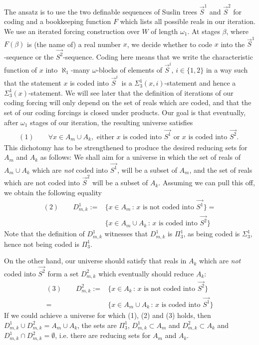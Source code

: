 \documentclass[a4paper,11pt]{article}
\begin{document}
The ansatz is to use the two definable sequences of Suslin trees $\vec{S}^1$ and $\vec{S}^2$ for coding and a bookkeeping function $F$ which lists all possible reals in our iteration. We use an iterated forcing construction over $W$ of length $\omega_1$. At stages $\beta$, where $F(\beta)$ is (the name of) a real number $x$, we decide whether to code $x$ into the $\vec{S}^1$-sequence or the $\vec{S^2}$-sequence. Coding here means that we write the characteristic function of $x$ into $\aleph_1$-many $\omega$-blocks of elements of $\vec{S}^i$, $i \in \{1,2\}$ in a way such that the statement \ldq $x$ is coded into $\vec{S}^i$\rdq\, is a $\Sigma^1_3(x,i)$-statement and hence a $\Sigma^1_3(x)$-statement. We will see later that the definition of iterations of our coding forcing will only depend on the set of reals which are coded, and that the set of our coding forcings is closed under products.
Our goal is that eventually, after $\omega_1$ stages of our iteration, the resulting universe satisfies 
\begin{align*}
(1) \qquad \forall x \in A_m \cup A_k,\text{ either $x$ is coded into $\vec{S^1}$ or $x$ is coded into $\vec{S^2}$. } 
\end{align*} 
This dichotomy has to be strengthened to produce the desired reducing sets for $A_m$ and $A_k$ as follows:
We shall aim for a universe in which the set of reals of $A_m \cup A_k$ which are \emph{not} coded  into $\vec{S^1}$,  will be a subset of $A_m$, and the set of reals which are not coded into $\vec{S}^2$ will be a subset of $A_k$. Assuming we can pull this off, we obtain the following equality
\begin{align*}
(2) \qquad D^1_{m,k}:= & \{ x \in A_m  \, : \, x \text{ is  not coded into $\vec{S^1}$} \}  = \\& \{ x \in A_m  \cup A_k \, : \, x \text{ is coded  into $\vec{S^2}$} \}
\end{align*}
Note that the definition of $D^1_{m,k}$ witnesses that $D^1_{m,k}$ is $\Pi^1_3$, as being coded is $\Sigma^1_3$, hence not being coded is $\Pi^1_3$.

On the other hand, our universe should satisfy that reals in $A_k$ which are \emph{not} coded into $\vec{S^2}$ form a set  $D^2_{m,k}$ which eventually should reduce $A_k$:
\begin{align*}
(3) \qquad D^2_{m,k}:= & \{ x \in  A_k \, : \, x \text{ is  not coded  into $\vec{S^2}$} \} \\=& \{ x \in A_m \cup A_k \, : \, x \text{ is coded  into $\vec{S^1}$} \} 
\end{align*}
If we could achieve a universe for which (1), (2) and (3) holds, then $D^1_{m,k} \cup D^2_{m,k} = A_m \cup A_k$, the sets are $\Pi^1_3$, $D^1_{m,k} \subset A_m$ and $D^2_{m,k} \subset A_k$ and $D^1_{m,k} \cap D^2_{m,k} = \emptyset$, i.e. there are reducing sets for $A_m$ and $A_k$.
 
\end{document}
